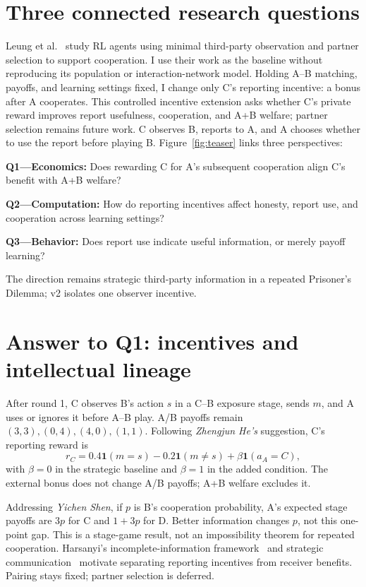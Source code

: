 \section{Three connected research questions}
Leung et al.~\cite{leung2026} study RL agents using minimal third-party observation and partner selection to support cooperation. I use their work as the baseline without reproducing its population or interaction-network model. Holding A--B matching, payoffs, and learning settings fixed, I change only C's reporting incentive: a bonus after A cooperates. This controlled incentive extension asks whether C's private reward improves report usefulness, cooperation, and A+B welfare; partner selection remains future work. C observes B, reports to A, and A chooses whether to use the report before playing B. Figure~\ref{fig:teaser} links three perspectives:

\textbf{Q1---Economics:} Does rewarding C for A's subsequent cooperation align C's benefit with A+B welfare?\par
\textbf{Q2---Computation:} How do reporting incentives affect honesty, report use, and cooperation across learning settings?\par
\textbf{Q3---Behavior:} Does report use indicate useful information, or merely payoff learning?

The direction remains strategic third-party information in a repeated Prisoner's Dilemma; v2 isolates one observer incentive.

\section{Answer to Q1: incentives and intellectual lineage}
After round 1, C observes B's action $s$ in a C--B exposure stage, sends $m$, and A uses or ignores it before A--B play. A/B payoffs remain $(3,3),(0,4),(4,0),(1,1)$. Following \emph{Zhengjun He's} suggestion, C's reporting reward is
\[
r_C=0.4\mathbf{1}(m=s)-0.2\mathbf{1}(m\ne s)
     +\beta\mathbf{1}(a_A=C),
\]
with $\beta=0$ in the strategic baseline and $\beta=1$ in the added condition. The external bonus does not change A/B payoffs; A+B welfare excludes it.

Addressing \emph{Yichen Shen}, if $p$ is B's cooperation probability, A's expected stage payoffs are $3p$ for C and $1+3p$ for D. Better information changes $p$, not this one-point gap. This is a stage-game result, not an impossibility theorem for repeated cooperation. Harsanyi's incomplete-information framework~\cite{harsanyi1968} and strategic communication~\cite{crawford1982} motivate separating reporting incentives from receiver benefits. Pairing stays fixed; partner selection is deferred.

